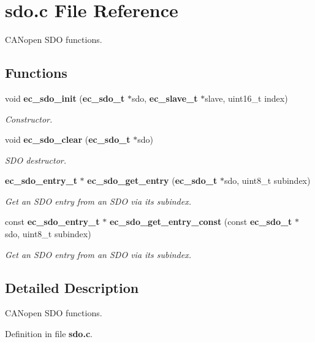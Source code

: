 \section{sdo.\-c \-File \-Reference}
\label{sdo_8c}


\-C\-A\-Nopen \-S\-D\-O functions.  


\subsection*{\-Functions}
\begin{DoxyCompactItemize}
\item 
void {\bf ec\-\_\-sdo\-\_\-init} ({\bf ec\-\_\-sdo\-\_\-t} $\ast$sdo, {\bf ec\-\_\-slave\-\_\-t} $\ast$slave, uint16\-\_\-t index)
\begin{DoxyCompactList}\small\item\em \-Constructor. \end{DoxyCompactList}\item 
void {\bf ec\-\_\-sdo\-\_\-clear} ({\bf ec\-\_\-sdo\-\_\-t} $\ast$sdo)
\begin{DoxyCompactList}\small\item\em \-S\-D\-O destructor. \end{DoxyCompactList}\item 
{\bf ec\-\_\-sdo\-\_\-entry\-\_\-t} $\ast$ {\bf ec\-\_\-sdo\-\_\-get\-\_\-entry} ({\bf ec\-\_\-sdo\-\_\-t} $\ast$sdo, uint8\-\_\-t subindex)
\begin{DoxyCompactList}\small\item\em \-Get an \-S\-D\-O entry from an \-S\-D\-O via its subindex. \end{DoxyCompactList}\item 
const {\bf ec\-\_\-sdo\-\_\-entry\-\_\-t} $\ast$ {\bf ec\-\_\-sdo\-\_\-get\-\_\-entry\-\_\-const} (const {\bf ec\-\_\-sdo\-\_\-t} $\ast$sdo, uint8\-\_\-t subindex)
\begin{DoxyCompactList}\small\item\em \-Get an \-S\-D\-O entry from an \-S\-D\-O via its subindex. \end{DoxyCompactList}\end{DoxyCompactItemize}


\subsection{\-Detailed \-Description}
\-C\-A\-Nopen \-S\-D\-O functions. 

\-Definition in file {\bf sdo.\-c}.



